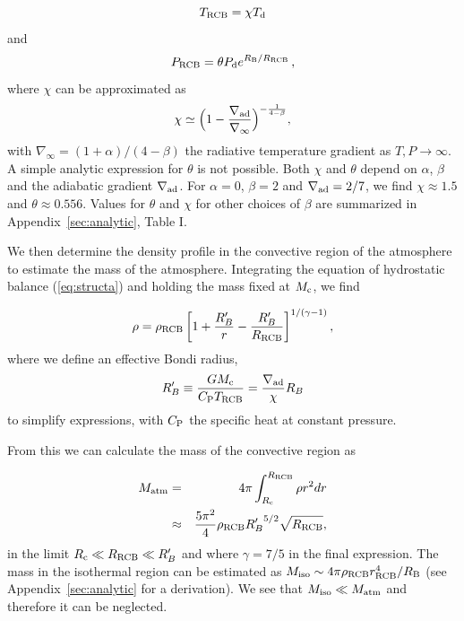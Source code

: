 \documentclass[apj]{emulateapj}
\newcommand{\delad}{\nabla_{\rm ad}}
\newcommand{\App}[1]{Appendix~\ref{#1}}
\newcommand{\co}{_{\rm c}}
\newcommand{\di}{_{\rm d}}
\newcommand{\cb}{_{\rm RCB}}
\begin{document}
\begin{equation}
\label{eq:Tcb}
T\cb = \chi T\di
\end{equation} 
and
 \begin{equation}\label{eq:PcbRcb}
P\cb = \theta P_{\rm d} e^{R_{\rm B}/R\cb} \, ,
\end{equation}
where $\chi$ can be approximated as
\begin{equation}
\label{eq:chi}
\chi \simeq \Big(1-\frac{\delad}{\nabla_{\infty}} \Big)^{-\frac{1}{4-\beta}} ,
\end{equation}
with $\nabla_{\infty}=(1+\alpha)/(4-\beta)$ the radiative temperature gradient as $T, P \rightarrow \infty$. A simple analytic expression for $\theta$ is not possible. Both $\chi$ and $\theta$ depend on $\alpha$, $\beta$ and the adiabatic gradient $\delad$. For $\alpha=0$, $\beta=2$ and $\delad=2/7$, we find $\chi \approx 1.5$ and $\theta \approx 0.556$. Values for $\theta$ and $\chi$ for other choices of $\beta$ are summarized in \App{sec:analytic}, Table I. 

We then determine the density profile in the convective region of the atmosphere to estimate the mass of the atmosphere. Integrating the equation of hydrostatic balance (\ref{eq:structa}) and holding the mass fixed at $M\co$, we find

\begin{equation}\label{eq:rhoconv} 
\rho = \rho\cb \left[ 1 + {R_B' \over r} - {R_B' \over R\cb}  \right]^{1/(\gamma -1)},
\end{equation} 
where we define an effective Bondi radius,
\begin{equation}
R_B' \equiv {G M\co \over C_{\rm P} T\cb} = {\delad \over \chi} R_B
\end{equation} 
to simplify expressions, with $C_{\rm P}$ the specific heat at constant pressure.

From this we can calculate the mass of the convective region as

\begin{eqnarray} 
\label{eq:Matman}
M_{\rm atm} &=& 4 \pi \int_{R\co}^{R\cb} \rho r^2 dr \\
&\approx& {5 \pi^2 \over 4} \rho\cb {R_B'}^{5/2} \sqrt{R\cb}, %
\end{eqnarray}
in the limit $R\co \ll R\cb \ll R_B'$ and where $\gamma=7/5$ in the final expression. The mass in the isothermal region can be estimated as $M_{\rm iso} \sim 4 \pi \rho\cb r\cb^4/R_{\rm B}$ (see \App{sec:analytic} for a derivation).  We see that $M_{\rm{iso}} \ll M_{\rm{atm}}$ and therefore it can be neglected.
\end{document}
